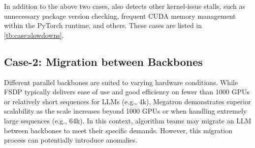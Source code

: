 
In addition to the above two cases, \sysname{} also detects other kernel-issue stalls, such as unnecessary package version checking, frequent CUDA memory management within the PyTorch runtime, and others. These cases are listed in \autoref{tb:case:slowdowns}.






\subsection{Case-2: Migration between Backbones}

Different parallel backbones are suited to varying hardware conditions. While FSDP typically delivers ease of use and good efficiency on fewer than 1000 GPUs or relatively short sequences for LLMs (e.g., 4k), Megatron demonstrates superior scalability as the scale increases beyond 1000 GPUs or when handling extremely large sequences (e.g., 64k). In this context, algorithm teams may migrate an LLM between backbones to meet their specific demands. However, this migration process can potentially introduce anomalies.

